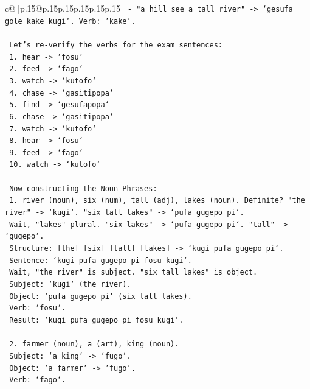 \documentclass{article}
\begin{document}
{\begin{supertabular}{c@{$\;$}|p{.15\linewidth}@{}p{.15\linewidth}p{.15\linewidth}p{.15\linewidth}p{.15\linewidth}p{.15\linewidth}}
{{{\texttt{    {-} "a hill see a tall river" {-}> `gesufa gole kake kugi`. Verb: `kake`.} \\
\\ 
\texttt{    Let's re{-}verify the verbs for the exam sentences:} \\
\texttt{    1. hear {-}> `fosu`} \\
\texttt{    2. feed {-}> `fago`} \\
\texttt{    3. watch {-}> `kutofo`} \\
\texttt{    4. chase {-}> `gasitipopa`} \\
\texttt{    5. find {-}> `gesufapopa`} \\
\texttt{    6. chase {-}> `gasitipopa`} \\
\texttt{    7. watch {-}> `kutofo`} \\
\texttt{    8. hear {-}> `fosu`} \\
\texttt{    9. feed {-}> `fago`} \\
\texttt{    10. watch {-}> `kutofo`} \\
\\ 
\texttt{    Now constructing the Noun Phrases:} \\
\texttt{    1. river (noun), six (num), tall (adj), lakes (noun). Definite? "the river" {-}> `kugi`. "six tall lakes" {-}> `pufa gugepo pi`.} \\
\texttt{       Wait, "lakes" plural. "six lakes" {-}> `pufa gugepo pi`. "tall" {-}> `gugepo`.} \\
\texttt{       Structure: {[}the{]} {[}six{]} {[}tall{]} {[}lakes{]} {-}> `kugi pufa gugepo pi`.} \\
\texttt{       Sentence: `kugi pufa gugepo pi fosu kugi`.} \\
\texttt{       Wait, "the river" is subject. "six tall lakes" is object.} \\
\texttt{       Subject: `kugi` (the river).} \\
\texttt{       Object: `pufa gugepo pi` (six tall lakes).} \\
\texttt{       Verb: `fosu`.} \\
\texttt{       Result: `kugi pufa gugepo pi fosu kugi`.} \\
\\ 
\texttt{    2. farmer (noun), a (art), king (noun).} \\
\texttt{       Subject: `a king` {-}> `fugo`.} \\
\texttt{       Object: `a farmer` {-}> `fugo`.} \\
\texttt{       Verb: `fago`.} \\
}}}
\end{supertabular}}
\end{document}
